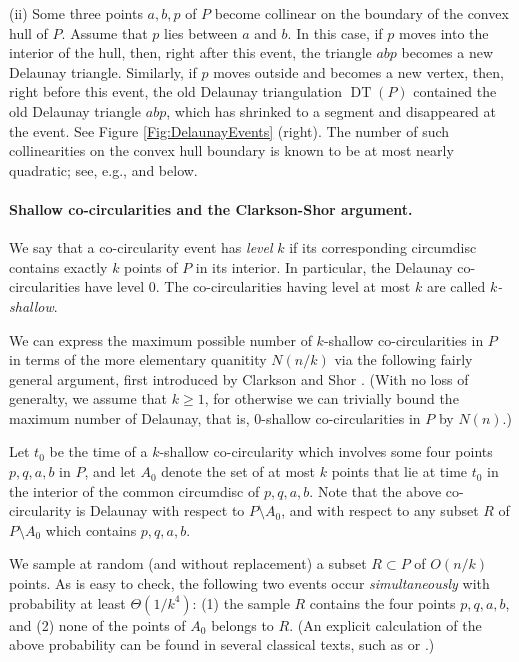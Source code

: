 \documentclass[letter,11pt]{article}
\def\DT{\mathop{\mathrm{DT}}}
\begin{document}
(ii) Some three points $a,b,p$ of $P$ become collinear on the boundary of the convex hull of $P$. Assume that $p$ lies between $a$ and $b$. In this case, if $p$ moves into the interior of the hull, then, right after this event, the triangle $abp$ becomes a new Delaunay triangle. Similarly, if $p$ moves outside and becomes a new vertex, then, right before this event, the old Delaunay triangulation $\DT(P)$ contained the old Delaunay triangle $abp$, which has shrinked to a segment and disappeared at the event. See Figure \ref{Fig:DelaunayEvents} (right).
The number of such collinearities on the convex hull boundary is known to be at most nearly quadratic; see, e.g., \cite[Section 8.6.1]{SA95} and below.




\paragraph{Shallow co-circularities and the Clarkson-Shor argument.}
We say that a co-circularity event has {\it level} $k$ if its corresponding circumdisc contains exactly $k$ points of $P$ in its interior. In particular, the Delaunay co-circularities have level $0$. The co-circularities having level at most $k$ are called {\it $k$-shallow}.

We can express the maximum possible number of $k$-shallow co-circularities in $P$ in terms of the more elementary quanitity $N(n/k)$ via the following fairly general argument, first introduced by Clarkson and Shor \cite{CS}.
(With no loss of generalty, we assume that $k\geq 1$, for otherwise we can trivially bound the maximum number of Delaunay, that is, $0$-shallow co-circularities in $P$ by $N(n)$.)

Let $t_0$ be the time of a $k$-shallow co-circularity which involves some four points $p,q,a,b$ in $P$, and let $A_0$ denote the set of at most $k$ points that lie at time $t_0$ in the interior of the common circumdisc of $p,q,a,b$. Note that the above co-circularity is Delaunay with respect to $P\setminus A_0$, and with respect to any subset $R$ of $P\setminus A_0$ which contains $p,q,a,b$.

We sample at random (and without replacement) a subset $R\subset P$ of $O(n/k)$ points. As is easy to check, the following two events occur {\it simultaneously} with probability at least $\Theta(1/k^4)$: (1) the sample $R$ contains the four points $p,q,a,b$, and (2) none of the points of $A_0$ belongs to $R$. (An explicit calculation of the above probability can be found in several classical texts, such as \cite{CS} or \cite{SA95}.)
\end{document}
